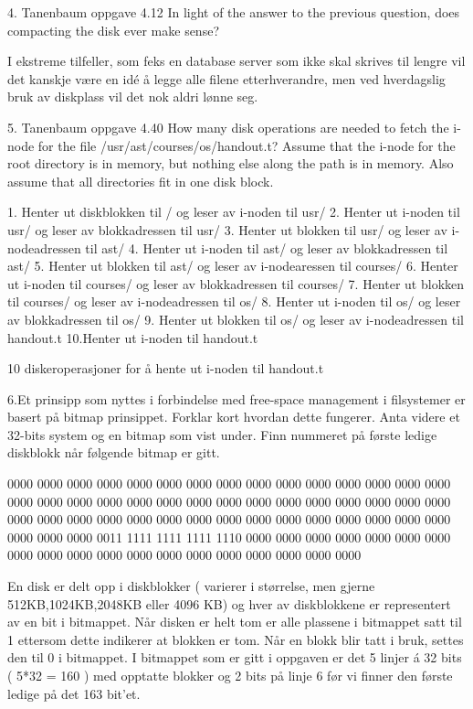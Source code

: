 4. Tanenbaum oppgave 4.12
In light of the answer to the previous question, does compacting the disk ever make sense?

I ekstreme tilfeller, som feks en database server som ikke skal skrives til lengre vil det kanskje være en idé å legge alle filene etterhverandre, men ved hverdagslig bruk av diskplass vil det nok aldri lønne seg.

5. Tanenbaum oppgave 4.40
How many disk operations are needed to fetch the i-node for the file /usr/ast/courses/os/handout.t? Assume that the i-node for the root directory is in memory, but nothing else along the path is in memory. Also assume that all directories fit in one disk block.

1. Henter ut diskblokken til / og leser av i-noden til usr/
2. Henter ut i-noden til usr/ og leser av blokkadressen til usr/
3. Henter ut blokken til usr/ og leser av i-nodeadressen til ast/
4. Henter ut i-noden til  ast/ og leser av blokkadressen til ast/
5. Henter ut blokken til ast/ og leser av i-nodearessen til courses/
6. Henter ut i-noden til courses/ og leser av blokkadressen til courses/
7. Henter ut blokken til courses/ og leser av i-nodeadressen til os/
8. Henter ut i-noden til os/ og leser av blokkadressen til os/
9. Henter ut blokken til os/ og leser av i-nodeadressen til handout.t
10.Henter ut i-noden til handout.t

10 diskeroperasjoner for å hente ut i-noden til handout.t 

6.Et prinsipp som nyttes i forbindelse med free-space management i filsystemer er basert på bitmap prinsippet. Forklar kort hvordan dette fungerer. Anta videre et 32-bits system og en bitmap som vist under. 
Finn nummeret på første ledige diskblokk når følgende bitmap er gitt.

0000 0000 0000 0000 0000 0000 0000 0000
0000 0000 0000 0000 0000 0000 0000 0000
0000 0000 0000 0000 0000 0000 0000 0000
0000 0000 0000 0000 0000 0000 0000 0000
0000 0000 0000 0000 0000 0000 0000 0000
0000 0000 0000 0000 0000 0000 0000 0000
0011 1111 1111 1111 1110 0000 0000 0000
0000 0000 0000 0000 0000 0000 0000 0000
0000 0000 0000 0000 0000 0000 0000 0000

En disk er delt opp i diskblokker ( varierer i størrelse, men gjerne 512KB,1024KB,2048KB eller 4096 KB) og hver av diskblokkene er representert av en bit i bitmappet. Når disken er helt tom er alle plassene i bitmappet satt til 1 ettersom dette indikerer at blokken er tom. Når en blokk blir tatt i bruk, settes den til 0 i bitmappet. I bitmappet som er gitt i oppgaven er det 5 linjer á 32 bits ( 5*32 = 160 ) med opptatte blokker og 2 bits på linje 6 før vi finner den første ledige på det 163 bit'et.

